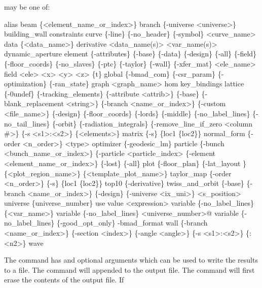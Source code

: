 {{ may be one of:
\begin{example}
  alias
  beam \{<element_name_or_index>\}
  branch \{-universe <universe>\} 
  building_wall  
  constraints
  curve \{-line\} \{-no_header\} \{-symbol\} <curve_name> 
  data \{<data_name>\} 
  derivative <data_name(s)> <var_name(s)>
  dynamic_aperture
  element \{-attributes\} \{-base\} \{-data\} \{-design\} \{-all\} \{-field\} 
        \{-floor_coords\} \{-no_slaves\} \{-ptc\} \{-taylor\} \{-wall\} \{-xfer_mat\} <ele_name>
  field <ele> <x> <y> <z> \{t\}
  global \{-bmad_com\} \{-csr_param\} \{-optimization\} \{-ran_state\} 
  graph <graph_name>
  hom
  key_bindings
  lattice \{-0undef\} \{-tracking_elements\} \{-attribute <attrib>\} \{-base\} 
        \{-blank_replacement <string>\} \{-branch <name_or_index>\} 
        \{-custom <file_name>\} \{-design\} \{-floor_coords\} \{-lords\} \{-middle\} 
        \{-no_label_lines\} \{-no_tail_lines\} \{-orbit\} \{-radiation_integrals\} 
        \{-remove_line_if_zero <column \#>\} \{-s <s1>:<s2>\} \{<elements>\} 
  matrix \{-s\} \{loc1 \{loc2\}\}
  normal_form \{-order <n_order>\} <type>
  optimizer \{-geodesic_lm\}
  particle \{-bunch <bunch_name_or_index>\} \{-particle <particle_index> 
        \{-element <element_name_or_index>\} \{-lost\} \{-all\}
  plot \{-floor_plan\} \{-lat_layout \} \{<plot_region_name>\} \{<template_plot_name>\} 
  taylor_map \{-order <n_order>\} \{-s\} \{loc1 \{loc2\}\}
  top10 \{-derivative\}
  twiss_and_orbit \{-base\} \{-branch <name_or_index>\} \{-design\} 
        \{-universe <ix_uni>\} <s_position>
  universe \{universe_number\}
  use
  value <expression>
  variable \{-no_label_lines\} \{<var_name>\}
  variable \{-no_label_lines\} <universe_number>@
  variable \{-no_label_lines\} \{-good_opt_only\} -bmad_format
  wall \{-branch <name_or_index>\} \{-section <index>\} \{-angle <angle>\} 
        \{-s <s1>:<s2>\} \{<n1>:<n2>\}
  wave
\end{example}

\vskip 0.2in 

The  command has  and 
optional arguments which can be used to write the results to a file.
The  command will appended to the output file. The
 command will first erase the contents of the output
file. If \vn{global%
digit number is substituted for the \vn{*}. The value of the number
starts at \vn{001} and increases by 1 each time \vn{show -write} is
used.  Example:
\begin{example}
  show -write orb.dat orbit    ! Write orbit data to the file "orb.dat".
\end{example}

}}}

